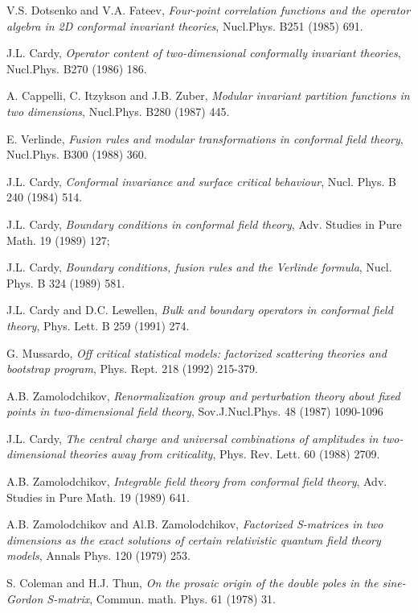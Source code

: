 \documentclass[a4paper,12pt]{report}
\begin{document}
\begin{thebibliography}{23}
 V.S. Dotsenko and V.A. Fateev, \textit{Four-point correlation functions and the operator algebra in 2D conformal
invariant theories}, Nucl.Phys. B251 (1985) 691.

 J.L. Cardy, \textit{Operator content of two-dimensional conformally invariant theories}, Nucl.Phys. B270 (1986) 186.

 A. Cappelli, C. Itzykson and J.B. Zuber, \textit{Modular invariant partition
functions in two dimensions}, Nucl.Phys. B280 (1987) 445.

 E. Verlinde, \textit{Fusion rules and modular transformations in conformal field theory},
Nucl.Phys. B300 (1988) 360.




 J.L. Cardy, {\it Conformal invariance and surface critical behaviour}, Nucl. Phys. B 240 (1984) 514.


 J.L. Cardy, {\it Boundary conditions in conformal field theory}, Adv. Studies in Pure Math. 19 (1989)
127;

J.L. Cardy, {\it Boundary conditions, fusion rules and the Verlinde formula}, Nucl. Phys. B 324 (1989) 581.


 J.L. Cardy and D.C. Lewellen, {\it Bulk and boundary operators in conformal field theory},
Phys. Lett. B 259 (1991) 274.




 G. Mussardo, {\it Off critical statistical models: factorized scattering theories and bootstrap program},
Phys. Rept. 218 (1992) 215-379.

 A.B. Zamolodchikov, {\it Renormalization group and perturbation theory about fixed points in
two-dimensional field theory}, Sov.J.Nucl.Phys. 48 (1987) 1090-1096

 J.L. Cardy, \textit{The central charge and universal combinations of amplitudes in two-dimensional
 theories away from criticality}, Phys. Rev. Lett. 60 (1988) 2709.

 A.B. Zamolodchikov, {\it Integrable field theory from conformal field theory},
Adv. Studies in Pure Math. 19 (1989) 641.

 A.B. Zamolodchikov and Al.B. Zamolodchikov, {\it Factorized S-matrices in two dimensions as the exact
solutions of certain relativistic quantum field theory models}, Annals Phys. 120 (1979) 253.


 S. Coleman and H.J. Thun, {\it On the prosaic origin of the double poles in the sine-Gordon S-matrix},
Commun. math. Phys. 61 (1978) 31.


\end{thebibliography}
\end{document}
